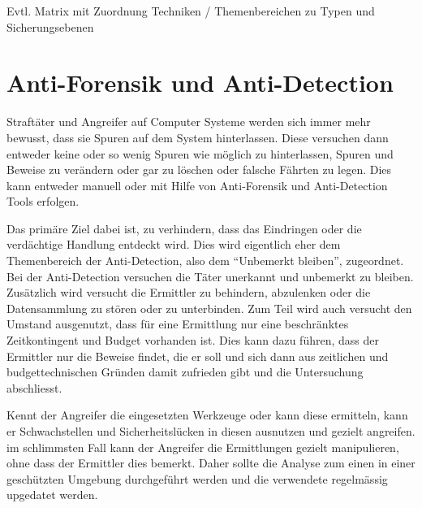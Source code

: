 Evtl. Matrix mit Zuordnung Techniken / Themenbereichen zu Typen und Sicherungsebenen

\section{Anti-Forensik und Anti-Detection}
Straftäter und Angreifer auf Computer Systeme werden sich immer mehr bewusst, dass sie Spuren auf dem System hinterlassen. Diese versuchen dann entweder keine oder so wenig Spuren wie möglich zu hinterlassen, Spuren und Beweise zu verändern oder gar zu löschen oder falsche Fährten zu legen. Dies kann entweder manuell oder mit Hilfe von Anti-Forensik und Anti-Detection Tools erfolgen.

Das primäre Ziel dabei ist, zu verhindern, dass das Eindringen oder die verdächtige Handlung entdeckt wird. Dies wird eigentlich eher dem Themenbereich der Anti-Detection, also dem "`Unbemerkt bleiben"', zugeordnet. Bei der Anti-Detection versuchen die Täter unerkannt und unbemerkt zu bleiben. Zusätzlich wird versucht die Ermittler zu behindern, abzulenken oder die Datensammlung zu stören oder zu unterbinden. Zum Teil wird auch versucht den Umstand ausgenutzt, dass für eine Ermittlung nur eine beschränktes Zeitkontingent und Budget vorhanden ist. Dies kann dazu führen, dass der Ermittler nur die Beweise findet, die er soll und sich dann aus zeitlichen und budgettechnischen Gründen damit zufrieden gibt und die Untersuchung abschliesst.

Kennt der Angreifer die eingesetzten Werkzeuge oder kann diese ermitteln, kann er Schwachstellen und Sicherheitslücken in diesen ausnutzen und gezielt angreifen. im schlimmsten Fall kann der Angreifer die Ermittlungen gezielt manipulieren, ohne dass der Ermittler dies bemerkt. Daher sollte die Analyse zum einen in einer geschützten Umgebung durchgeführt werden und die verwendete regelmässig upgedatet werden.

